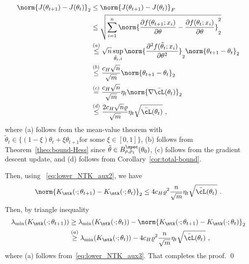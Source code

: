 \begin{align*}
\norm{J(\theta_{t+1})-J(\theta_t)}_2
& \leq \norm{J(\theta_{t+1})-J(\theta_t)}_F \\
& \leq \sqrt{\sum^n_{i=1}\norm{\frac{\partial f(\theta_{t+1};x_i)}{\partial \theta} - \frac{\partial f(\theta_t;x_i)}{\partial \theta}}_2^2}\\
    &\overset{(a)}{\leq} \sqrt{n} \sup_{\tilde{\theta}_t, i} \norm{\frac{\partial^2 f(\tilde{\theta}_t;x_i)}{\partial \theta^2}}_2 \norm{\theta_{t+1}-\theta_t}_2 \\
    &\overset{(b)}{\leq}\frac{c_H \sqrt{n} }{\sqrt{m}}  \norm{\theta_{t+1}-\theta_t}_2\\
    &\overset{(c)}{=}  \frac{c_H \sqrt{n} }{\sqrt{{m}}} \eta_t \norm{ \nabla \bar{\cL}(\theta_t)}_2 \\
    & \overset{(d)}{\leq} \frac{2 c_H \sqrt{n}  \varrho}{\sqrt{m}} \eta_t \sqrt{\bar{\cL}(\theta_t)}~,
\end{align*}
where (a) follows from the mean-value theorem with $\tilde{\theta}_t\in\{(1-\xi) \theta_t+\xi \theta_{t+1} \text{for some } \xi\in[0,1]\}$, (b) follows from Theorem~\ref{theo:bound-Hess} since $\tilde{\theta}\in B_{\rho,\rho_1}^{\spec}(\theta_0)$, (c) follows from the gradient descent update, and (d) follows from Corollary~\ref{cor:total-bound}. 

Then, using ~\eqref{eq:lower_NTK_aux2}, we have
\begin{equation}
\label{eq:lower_NTK_aux3}    
\norm{K_{\ntk}(\cdot;\theta_{t+1})-K_{\ntk}(\cdot;\theta_t)}_2
\leq 4 c_H \varrho^2  \frac{n}{\sqrt{m}} \eta_t \sqrt{\bar{\cL}(\theta_t)}~.
\end{equation}
Then, by triangle inequality 
\begin{align*}
\lambda_{\min}(K_{\ntk}(\cdot;\theta_{t+1})) 
& \geq \lambda_{\min}(K_{\ntk}(\cdot;\theta_t)) - \norm{K_{\ntk}(\cdot;\theta_{t+1})-K_{\ntk}(\cdot;\theta_t)}_2 \\
&\overset{(a)}{\geq} \lambda_{\min}(K_{\ntk}(\cdot;\theta_t)) -  4 c_H \varrho^2  \frac{n}{\sqrt{m}} \eta_t \sqrt{\bar{\cL}(\theta_t)}~,
\end{align*}
where (a) follows from~\eqref{eq:lower_NTK_aux3}. That completes the proof.  \qed 

\abdelete{
\corrNTKinit*
%
\proof  \qed }





